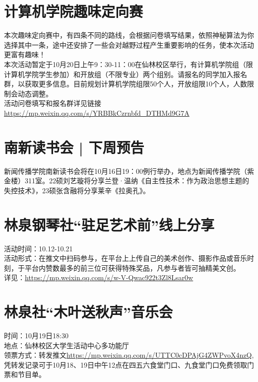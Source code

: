 \documentclass[letterpaper, 12pt]{article}
\begin{document}
\begin{multicols}{2}
\section{计算机学院趣味定向赛}
本次趣味定向赛中，有四条不同的路线，会根据问卷填写结果，依照神秘算法为你选择其中一条，途中还安排了一些会对越野过程产生重要影响的任务，使本次活动更富有趣味！\\
本次活动暂定于10月20日上午9：30-11：00在仙林校区举行，有计算机学院组（限计算机学院学生参加）和开放组（不限专业）两个组别。请报名的同学加入报名群，以获取更多信息。目前规划计算机学院组限50个人，开放组限10个人，人数限制会动态调整。\\
活动问卷填写和报名群详见链接\url{https://mp.weixin.qq.com/s/YRBBkCzrnbfd_DTHMd9G7A}
\section{南新读书会 | 下周预告}
新闻传播学院南新读书会将在10月16日19：00例行举办，地点为新闻传播学院（紫金楼）311室。22硕刘艺璇将分享兰登·温纳《自主性技术：作为政治思想主题的失控技术》，23硕张含融将分享莱辛《拉奥孔》。
\section{林泉钢琴社“驻足艺术前”线上分享}
活动时间：10.12-10.21\\
活动形式：在推文中扫码参与，在平台上上传自己的美术创作、摄影作品或音乐时刻，于平台内赞数最多的前三位可获得特殊奖品，凡参与者皆可抽精美文创。\\
详见：\url{https://mp.weixin.qq.com/s/w-V-Qwac922t3Zl8Lsar0w}
\section{林泉社“木叶送秋声”音乐会}
时间：10月19日18:30\\
地点：仙林校区大学生活动中心多功能厅\\
领票方式：转发推文\url{https://mp.weixin.qq.com/s/UTTC0cDPAjG4ZWPvoX4nzQ},凭转发记录可于10月18、19日中午12点在四五六食堂门口、九食堂门口免费领取门票和节目单。

\end{multicols}
\end{document}
